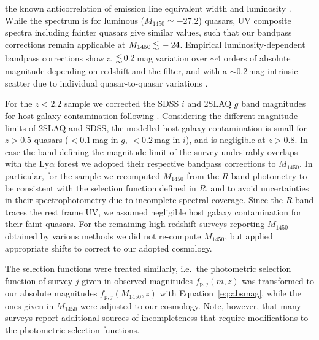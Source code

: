 \documentclass[fleqn,usenatbib]{mnras}
\begin{document}
the known anticorrelation of emission line equivalent width and
luminosity \citep{1977ApJ...214..679B}.  While the
\citet{2015MNRAS.449.4204L} spectrum is for luminous ($M_{1450}\simeq
-27.2$) quasars, UV composite spectra including fainter quasars
\citep{2002ApJ...565..773T, 2012ApJ...752..162S, 2014ApJ...794...75S}
give similar values, such that our bandpass corrections remain
applicable at $M_{1450}\la -24$. Empirical luminosity-dependent
bandpass corrections show a $\la 0.2$\,mag variation over $\sim 4$
orders of absolute magnitude depending on redshift and the filter, and
with a $\sim 0.2$\,mag intrinsic scatter due to individual quasar-to-quasar
variations \citep{2013ApJ...773...14R, 2013ApJ...768..105M,
  2013A&A...551A..29P}.

For the $z<2.2$ sample we corrected the SDSS $i$ and 2SLAQ $g$ band
magnitudes for host galaxy contamination following
\citet{2009MNRAS.392...19C}. Considering the different magnitude
limits of 2SLAQ and SDSS, the modelled host galaxy contamination is
small for $z>0.5$ quasars ($<0.1$\,mag in $g$, $<0.2$\,mag in $i$),
and is negligible at $z>0.8$.  In case the band defining the magnitude
limit of the survey undesirably overlaps with the Ly$\alpha$ forest
\citep{2010ApJ...710.1498G, 2011ApJ...728L..26G, 2013ApJ...768..105M}
we adopted their respective bandpass corrections to $M_{1450}$. In
particular, for the \citet{2010ApJ...710.1498G, 2011ApJ...728L..26G}
sample we recomputed $M_{1450}$ from the $R$ band photometry to be
consistent with the selection function defined in $R$, and to avoid
uncertainties in their spectrophotometry due to incomplete spectral
coverage. Since the \citet{2010ApJ...710.1498G, 2011ApJ...728L..26G}
$R$ band traces the rest frame UV, we assumed negligible host galaxy
contamination for their faint quasars. For the remaining high-redshift
surveys reporting $M_{1450}$ obtained by various methods
\citep{2010AJ....139..906W, 2011Natur.474..616M, 2015ApJ...798...28K,
  2015ApJ...801L..11V, 2016ApJ...829...33Y, 2016ApJ...833..222J,
  2018Natur.553..473B} we did not re-compute $M_{1450}$, but applied
appropriate shifts to correct to our adopted cosmology.

The selection functions were treated similarly, i.e.\ the photometric
selection function of survey $j$ given in observed magnitudes
$f_{\mathrm{p},j}\left(m,z\right)$ \citep{2006AJ....131.2766R,
  2009MNRAS.392...19C, 2010ApJ...710.1498G, 2013ApJ...773...14R} was
transformed to our absolute magnitudes
$f_{\mathrm{p},j}\left(M_{1450},z\right)$ with
Equation~\ref{eq:absmag}, while the ones given in $M_{1450}$ were
adjusted to our cosmology. Note, however, that many surveys report
additional sources of incompleteness that require modifications to the
photometric selection functions.
\end{document}
